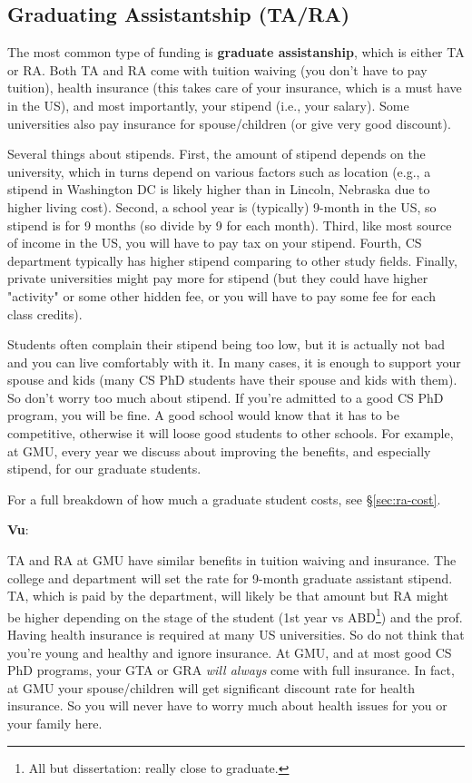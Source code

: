 \documentclass[11pt]{article}
\newenvironment{commentbox}[1][]{
\small
    \begin{cbox}
    \textbf{#1}: 
 }{
   \end{cbox}
}
\begin{document}
\subsection{Graduating Assistantship (TA/RA)}
The most common type of funding is \textbf{graduate assistanship}, which is either TA or RA. Both TA and RA come with tuition waiving (you don't have to pay tuition), health insurance (this takes care of your insurance, which is a must have in the US), and most importantly, your stipend (i.e., your salary). Some universities also pay insurance for spouse/children (or give very good discount).

Several things about stipends.  First, the amount of stipend depends on the university, which in turns depend on various factors such as location (e.g., a stipend in Washington DC is likely higher than in Lincoln, Nebraska due to higher living cost). Second, a school year is (typically) 9-month in the US, so stipend is for 9 months (so divide by 9 for each month). Third, like most source of income in the US, you will have to pay tax on your stipend.  Fourth, CS department typically has higher stipend comparing to other study fields.  Finally, private universities might pay more for stipend (but they could have higher "activity" or some other hidden fee, or you will have to pay some fee for each class credits).

Students often complain their stipend being too low, but it is actually not bad and you can live comfortably with it.  In many cases, it is enough to support your spouse and kids (many CS PhD students have their spouse and kids with them). So don't worry too much about stipend.  If you're admitted to a good CS PhD program, you will be fine. A good school would know that it has to be competitive, otherwise it will loose good students to other schools.  For example, at GMU, every year we discuss about improving the benefits, and especially stipend, for our graduate students. 

For a full breakdown of how much a graduate student costs, see \S\ref{sec:ra-cost}.

\begin{commentbox}[Vu]
TA and RA at GMU have similar benefits in tuition waiving and insurance.  The college and department will set the rate for 9-month graduate assistant stipend.  TA, which is paid by the department, will likely be that amount but RA might be higher depending on the stage of the student (1st year vs ABD\footnote{All but dissertation: really close to graduate.}) and the prof. 
\tcblower
Having health insurance is required at many US universities.  So do not think that you're young and healthy and ignore insurance.  At GMU, and at most good CS PhD programs, your GTA or GRA \emph{will always} come with full insurance. In fact, at GMU your spouse/children will get significant discount rate for health insurance.  So you will never have to worry much about health issues for you or your family here.
\end{commentbox}
\end{document}
